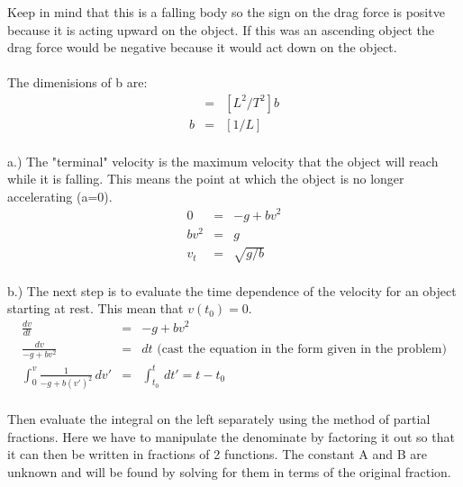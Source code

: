 \documentclass[11pt]{amsart}
\begin{document}
Keep in mind that this is a falling body so the sign on the drag force is positve because it is acting upward on the object. If this was an ascending object the drag force would be negative because it would act down on the object. \\ \\
The dimenisions of b are: \\ 
\begin{eqnarray*} 
[L/T^{2}] &=& [L^{2}/T^{2}]b \\
b &=& [1/L] 
\end{eqnarray*} \\
a.) The "terminal" velocity is the maximum velocity that the object will reach while it is falling. This means the point at which the object is no longer accelerating (a=0). \\ 
\begin{eqnarray*}
0 &= &-g + bv^{2} \\
bv^{2} &=& g \\
v_{t} &=& \sqrt{g/b} 
\end{eqnarray*} \\
b.) The next step is to evaluate the time dependence of the velocity for an object starting at rest. This mean that $v(t_{0}) = 0$. \\ 
\begin{eqnarray*}
\frac{dv}{dt} &=& -g +bv^{2} \\
\frac{dv}{-g +bv^{2}} &=& dt \mbox{ (cast the equation in the form given in the problem)} \\
\int^{v}_{0}\frac{1}{-g+b(v')^{2}}\,dv' &=& \int^{t}_{t_{0}}\,dt' = t-t_{0} 
\end{eqnarray*} \\
Then evaluate the integral on the left separately using the method of partial fractions. Here we have to manipulate the denominate by factoring it out so that it can then be written in fractions of 2 functions. The constant A and B are unknown and will be found by solving for them in terms of the original fraction. \\ 
\end{document}

